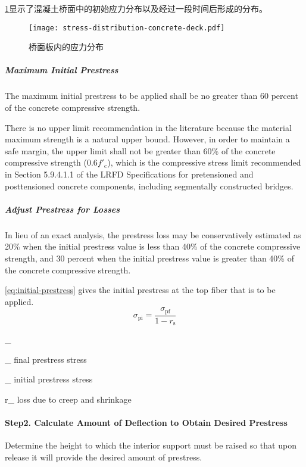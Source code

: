 \cref{fig:stress-distribution-concrete-deck}显示了混凝土桥面中的初始应力分布以及经过一段时间后形成的分布。

\begin{figure}
  \texttt{[image: stress-distribution-concrete-deck.pdf]}
  \caption{桥面板内的应力分布}
  \label{fig:stress-distribution-concrete-deck}
\end{figure}

\subparagraph*{Maximum Initial Prestress}

The maximum initial prestress to be applied shall be no greater than 60 percent of the concrete compressive strength.

There is no upper limit recommendation in the literature because the material maximum strength is a natural upper bound. However, in order to maintain a safe margin, the upper limit shall not be greater than 60\% of the concrete compressive strength ($0.6f'_\text{c}$), which is the compressive stress limit recommended in Section 5.9.4.1.1 of the LRFD Specifications for pretensioned and posttensioned concrete components, including segmentally constructed bridges.

\subparagraph*{Adjust Prestress for Losses}

In lieu of an exact analysis, the prestress loss may be conservatively estimated as 20\% when the initial prestress value is less than 40\% of the concrete compressive strength, and 30 percent when the initial prestress value is greater than 40\% of the concrete compressive strength.

\cref{eq:initial-prestress} gives the initial prestress at the top fiber that is to be applied.
\begin{equation}
  \label{eq:initial-prestress}
  \sigma_\text{pi}= \frac{\sigma_\text{pf}}{1-r_\text{s}}
\end{equation}
\begin{EqDesc}{\sigma_}
  \item[\sigma_\text{pf}] final prestress stress
  \item[\sigma_\text{pi}] initial prestress stress
  \item[r_\text{s}] loss due to creep and shrinkage
\end{EqDesc}

\paragraph*{Step2. Calculate Amount of Deflection to Obtain Desired Prestress}
Determine the height to which the interior support must be raised so that upon release it will provide the desired amount of prestress.

